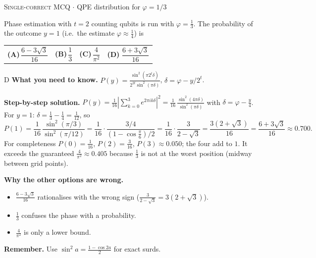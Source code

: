 \documentclass[11pt,a4paper]{article}
\newcommand{\optlabel}[1]{\textbf{(#1)}}
\newcommand{\correctlabel}[1]{\textcolor{okgreen}{\textbf{(#1)}\,\ding{51}}}
\newenvironment{qitem}[1]{\begin{list}{}{\setlength{\leftmargin}{3.3em}\setlength{\labelwidth}{3.1em}%
  \setlength{\labelsep}{0.2em}\setlength{\topsep}{3pt}\setlength{\parsep}{3pt}}\item[\textbf{Q.#1}\hfill]}{\end{list}}
\newcommand{\qsep}{\par\vspace{2pt}{\color{black!15}\hrule}\vspace{4pt}}
\newcommand{\qmeta}[2]{{\footnotesize\color{black!60}\textsc{#1} \;$\cdot$\; #2}\par}
\begin{document}
\begin{qitem}{67}
\qmeta{Single-correct MCQ}{QPE distribution for $\varphi = 1/3$}
Phase estimation with $t = 2$ counting qubits is run with $\varphi = \frac13$. The probability of the outcome $y = 1$
(i.e.\ the estimate $\varphi \approx \frac14$) is
\par\smallskip\noindent\begin{tabularx}{\linewidth}{@{}*{4}{L}@{}}
\optlabel{A}\,$\dfrac{6 - 3\sqrt3}{16}$ & \optlabel{B}\,$\dfrac13$ & \optlabel{C}\,$\dfrac{4}{\pi^2}$ & \correctlabel{D}\,$\dfrac{6 + 3\sqrt3}{16}$
\end{tabularx}
\end{qitem}
\begin{solbox}{D}
\textbf{\color{brand}What you need to know.} $P(y) = \frac{\sin^2(\pi2^t\delta)}{2^{2t}\sin^2(\pi\delta)}$, $\delta = \varphi - y/2^t$.

\textbf{\color{brand}Step-by-step solution.} $P(y) = \frac{1}{16}\left|\sum_{k=0}^{3}e^{2\pi i k\delta}\right|^2 = \frac{1}{16}\,\frac{\sin^2(4\pi\delta)}{\sin^2(\pi\delta)}$ with
$\delta = \varphi - \frac{y}{4}$. For $y = 1$: $\delta = \frac13 - \frac14 = \frac{1}{12}$, so
\[ P(1) = \frac{1}{16}\,\frac{\sin^2(\pi/3)}{\sin^2(\pi/12)} = \frac{1}{16}\cdot\frac{3/4}{(1 - \cos\frac\pi6)/2} = \frac{1}{16}\cdot\frac{3}{2 - \sqrt3}
   = \frac{3(2 + \sqrt3)}{16} = \frac{6 + 3\sqrt3}{16} \approx 0.700 . \]
For completeness $P(0) = \frac{1}{16}$, $P(2) = \frac{3}{16}$, $P(3) \approx 0.050$; the four add to $1$. It exceeds the guaranteed
$\frac{4}{\pi^2} \approx 0.405$ because $\frac13$ is not at the worst position (midway between grid points).

\textbf{\color{brand}Why the other options are wrong.}
\begin{itemize}[leftmargin=2.4em, itemsep=1pt, topsep=2pt]
\item[\textbf{(A)}] $\frac{6-3\sqrt3}{16}$ rationalises with the wrong sign ($\frac{3}{2-\sqrt3} = 3(2+\sqrt3)$).
\item[\textbf{(B)}] $\frac13$ confuses the phase with a probability.
\item[\textbf{(C)}] $\frac{4}{\pi^2}$ is only a lower bound.
\end{itemize}
\textbf{\color{brand}Remember.} Use $\sin^2 a = \frac{1-\cos 2a}{2}$ for exact surds.
\end{solbox}
\qsep
\end{document}
